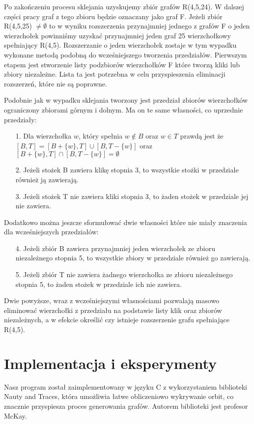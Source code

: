 \documentclass[11pt]{article}
\begin{document}
Po zakończeniu procesu sklejania uzyskujemy zbiór grafów R(4,5,24). W dalszej części pracy graf z tego zbioru będzie oznaczany jako graf F. Jeżeli zbiór R(4,5,25) $\neq \emptyset$ to w wyniku rozszerzenia przynajmniej jednego z grafów F o jeden wierzchołek powinniśmy uzyskać przynajmniej jeden graf 25 wierzchołkowy spełniający R(4,5). 
Rozszerzanie o jeden wierzchołek zostaje w tym wypadku wykonane metodą podobną do wcześniejszego tworzenia przedziałów. Pierwszym etapem jest stworzenie listy podzbiorów wierzchołków F które tworzą kliki lub zbiory niezależne. Lista ta jest potrzebna w celu przyspieszenia eliminacji rozszerzeń, które nie są poprawne.

Podobnie jak w wypadku sklejania tworzony jest przedział zbiorów wierzchołków ograniczony zbiorami górnym i dolnym. Ma on te same własności, co uprzednie przedziały:

\begin{enumerate}
  \item[1.] Dla wierzchołka $w$, który spełnia $w \notin B$ oraz $w\in T$ prawdą jest że $[B, T] = [B + \{ w\}, T] \cup [B , T - \{ w\}]$ oraz $[B +\{ w\}, T] \cap [B , T - \{ w\}] = \emptyset$
  
  \item[2.] Jeżeli stożek B zawiera klikę stopnia 3, to wszystkie stożki w przedziale również ją zawierają. 
  
  \item[3.] Jeżeli stożek T nie zawiera kliki stopnia 3, to żaden stożek w przedziale jej nie zawiera.
\end{enumerate}
Dodatkowo można jeszcze sformułować dwie własności które nie miały znaczenia dla wcześniejszych przedziałów:
\begin{enumerate}
\item[4.] Jeżeli zbiór B zawiera przynajmniej jeden wierzchołek ze zbioru niezależnego stopnia 5, to wszystkie zbiory w przedziale również go zawierają. 

\item[5.] Jeżeli zbiór T nie zawiera żadnego wierzchołka ze zbioru niezależnego stopnia 5, to żaden stożek w przedziale ich nie zawiera.
\end {enumerate}
Dwie powyższe, wraz z wcześniejszymi własnościami pozwalają masowo eliminować wierzchołki z przedziału na podstawie listy klik oraz zbiorów niezależnych, a w efekcie określić czy istnieje rozszerzenie grafu spełniające R(4,5).

\section{Implementacja i eksperymenty}
Nasz program został zaimplementowany w języku C z wykorzystaniem biblioteki Nauty and Traces\cite{nauty}, która umożliwia łatwe obliczeniowo wykrywanie orbit, co znacznie przyspiesza proces generowania grafów. 
Autorem biblioteki jest profesor McKay. 
\end{document}
